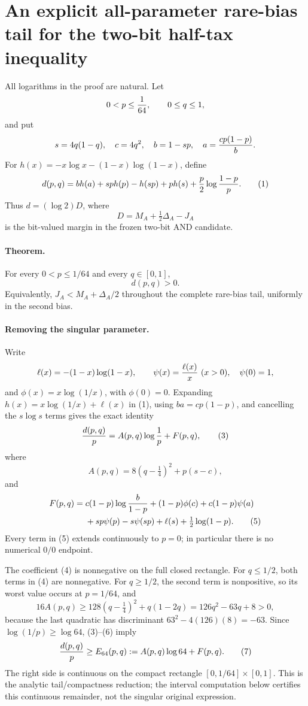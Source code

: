 \section*{An explicit all-parameter rare-bias tail for the two-bit half-tax inequality}

All logarithms in the proof are natural.  Let
\[
 0<p\le {1\over64},\qquad 0\le q\le1,
\]
and put
\[
 s=4q(1-q),\quad c=4q^2,\quad b=1-sp,\quad
 a={cp(1-p)\over b}.
\]
For $h(x)=-x\log x-(1-x)\log(1-x)$, define
\[
 d(p,q)=b h(a)+sp h(p)-h(sp)+p h(s)
          +{p\over2}\log{1-p\over p}.                 \tag{1}
\]
Thus $d=(\log 2)D$, where
\[
 D=M_A+\tfrac12\Delta_A-J_A
\]
is the bit-valued margin in the frozen two-bit AND candidate.

\paragraph{Theorem.}
For every $0<p\le1/64$ and every $q\in[0,1]$,
\[
 \boxed{d(p,q)>0.}                                     \tag{2}
\]
Equivalently, $J_A<M_A+\Delta_A/2$ throughout the complete rare-bias
tail, uniformly in the second bias.

\paragraph{Removing the singular parameter.}
Write
\[
 \ell(x)=-(1-x)\log(1-x),\qquad
 \psi(x)={\ell(x)\over x}\ (x>0),\quad\psi(0)=1,
\]
and $\phi(x)=x\log(1/x)$, with $\phi(0)=0$.  Expanding
$h(x)=x\log(1/x)+\ell(x)$ in (1), using $ba=cp(1-p)$, and cancelling the
$s\log s$ terms gives the exact identity
\[
 {d(p,q)\over p}=A(p,q)\log{1\over p}+F(p,q),           \tag{3}
\]
where
\[
 A(p,q)=8(q-\tfrac14)^2+p(s-c),                         \tag{4}
\]
and
\begin{align*}
 F(p,q)={}&c(1-p)\log{b\over1-p}+(1-p)\phi(c)
       +c(1-p)\psi(a)\\
 &+sp\psi(p)-s\psi(sp)+\ell(s)+\tfrac12\log(1-p).
                                                               \tag{5}
\end{align*}
Every term in (5) extends continuously to $p=0$; in particular there is
no numerical $0/0$ endpoint.

The coefficient (4) is nonnegative on the full closed rectangle.  For
$q\le1/2$, both terms in (4) are nonnegative.  For $q\ge1/2$, the second
term is nonpositive, so its worst value occurs at $p=1/64$, and
\[
 16A(p,q)\ge128(q-\tfrac14)^2+q(1-2q)
             =126q^2-63q+8>0,                          \tag{6}
\]
because the last quadratic has discriminant $63^2-4(126)(8)=-63$.
Since $\log(1/p)\ge\log64$, (3)--(6) imply
\[
 {d(p,q)\over p}\ge E_{64}(p,q):=A(p,q)\log64+F(p,q). \tag{7}
\]
The right side is continuous on the compact rectangle
$[0,1/64]\times[0,1]$.  This is the analytic tail/compactness reduction;
the interval computation below certifies this continuous remainder, not
the singular original expression.

